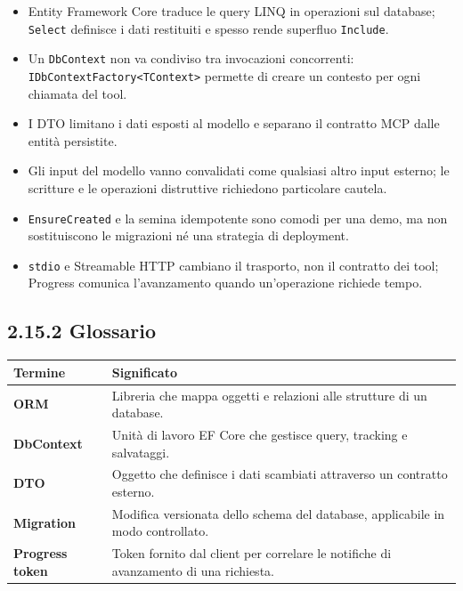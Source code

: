 \documentclass[
  italian,
  10pt,
]{book}
\newcounter{none} %
\providecommand{\tightlist}{%
  \setlength{\itemsep}{0pt}\setlength{\parskip}{0pt}}
\begin{document}
\begin{itemize}
\tightlist
\item
  Entity Framework Core traduce le query LINQ in operazioni sul
  database; \texttt{Select} definisce i dati restituiti e spesso rende
  superfluo \texttt{Include}.
\item
  Un \texttt{DbContext} non va condiviso tra invocazioni concorrenti:
  \texttt{IDbContextFactory\textless{}TContext\textgreater{}} permette
  di creare un contesto per ogni chiamata del tool.
\item
  I DTO limitano i dati esposti al modello e separano il contratto MCP
  dalle entità persistite.
\item
  Gli input del modello vanno convalidati come qualsiasi altro input
  esterno; le scritture e le operazioni distruttive richiedono
  particolare cautela.
\item
  \texttt{EnsureCreated} e la semina idempotente sono comodi per una
  demo, ma non sostituiscono le migrazioni né una strategia di
  deployment.
\item
  \texttt{stdio} e Streamable HTTP cambiano il trasporto, non il
  contratto dei tool; Progress comunica l'avanzamento quando
  un'operazione richiede tempo.
\end{itemize}

\subsection{2.15.2 Glossario}\label{glossario-1}

{\def\LTcaptype{none} %
\begin{longtable}[]{@{}
  >{\raggedright\arraybackslash}p{}
  >{\raggedright\arraybackslash}p{}@{}}
\toprule\noalign{}
\begin{minipage}[b]{\linewidth}\raggedright
Termine
\end{minipage} & \begin{minipage}[b]{\linewidth}\raggedright
Significato
\end{minipage} \\
\midrule\noalign{}
\endhead
\bottomrule\noalign{}
\endlastfoot
\textbf{ORM} & Libreria che mappa oggetti e relazioni alle strutture di
un database. \\
\textbf{DbContext} & Unità di lavoro EF Core che gestisce query,
tracking e salvataggi. \\
\textbf{DTO} & Oggetto che definisce i dati scambiati attraverso un
contratto esterno. \\
\textbf{Migration} & Modifica versionata dello schema del database,
applicabile in modo controllato. \\
\textbf{Progress token} & Token fornito dal client per correlare le
notifiche di avanzamento di una richiesta. \\
\end{longtable}
}
\end{document}
